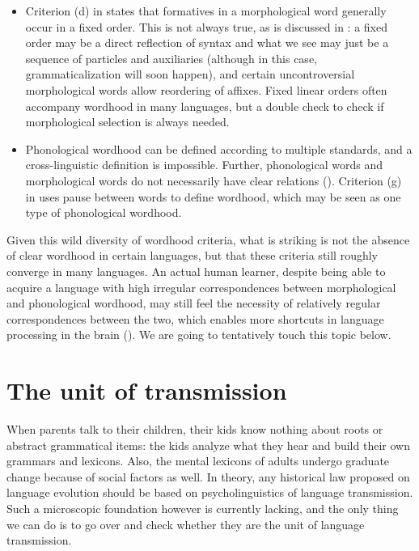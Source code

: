 \documentclass[a4paper, oneside, scheme=plain, 12pt]{article}
\newcommand*{\citepage}[1]{p.~{#1}}
\begin{document}
\begin{itemize}
    \item Criterion (d) in \citet[\citepage{14}]{dixon2010basic2} states that formatives in a morphological word generally occur in a fixed order.
    This is not always true, as is discussed in :
    a fixed order may be a direct reflection of syntax
    and what we see may just be a sequence of particles and auxiliaries
    (although in this case, grammaticalization will soon happen),
    and certain uncontroversial morphological words allow reordering of affixes.
    Fixed linear orders often accompany wordhood in many languages,
    but a double check to check if morphological selection is always needed.

    \item Phonological wordhood can be defined according to multiple standards,
    and a cross-linguistic definition is impossible.
    Further, phonological words and morphological words do not necessarily have clear relations
    ().
    Criterion (g) in \citet[\citepage{18}]{dixon2010basic2} uses pause between words to define  wordhood, which may be seen as one type of phonological wordhood.
\end{itemize}

Given this wild diversity of wordhood criteria,
what is striking is not the absence of clear wordhood in certain languages,
but that these criteria still roughly converge in many languages.
An actual human learner, despite being able to acquire a language with high irregular correspondences between morphological and phonological wordhood,
may still feel the necessity of relatively regular correspondences between the two,
which enables more shortcuts in language processing in the brain ().
We are going to tentatively touch this topic below.

\section{The unit of transmission}


When parents talk to their children,
their kids know nothing about roots or abstract grammatical items:
the kids analyze what they hear and build their own grammars and lexicons.
Also, the mental lexicons of adults undergo graduate change because of social factors as well.
In theory, any historical law proposed on language evolution 
should be based on psycholinguistics of language transmission.
Such a microscopic foundation however is currently lacking,
and the only thing we can do is to go over 
and check whether they are the unit of language transmission.
\end{document}
